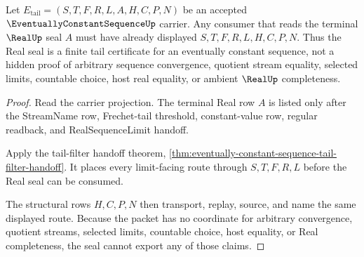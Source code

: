 \begin{theorem}
\label{thm:eventually-constant-sequence-real-seal-nonescape}
Let $E_{\mathrm{tail}}=(S,T,F,R,L,A,H,C,P,N)$ be an accepted $\EventuallyConstantSequenceUp$ carrier. Any consumer that reads the terminal $\RealUp$ seal $A$ must have already displayed $S,T,F,R,L,H,C,P,N$. Thus the Real seal is a finite tail certificate for an eventually constant sequence, not a hidden proof of arbitrary sequence convergence, quotient stream equality, selected limits, countable choice, host real equality, or ambient $\RealUp$ completeness.
\end{theorem}
\begin{proof}
Read the carrier projection. The terminal Real row $A$ is listed only after the StreamName row, Frechet-tail threshold, constant-value row, regular readback, and RealSequenceLimit handoff.

Apply the tail-filter handoff theorem, \autoref{thm:eventually-constant-sequence-tail-filter-handoff}. It places every limit-facing route through $S,T,F,R,L$ before the Real seal can be consumed.

The structural rows $H,C,P,N$ then transport, replay, source, and name the same displayed route. Because the packet has no coordinate for arbitrary convergence, quotient streams, selected limits, countable choice, host equality, or Real completeness, the seal cannot export any of those claims.
\end{proof}



